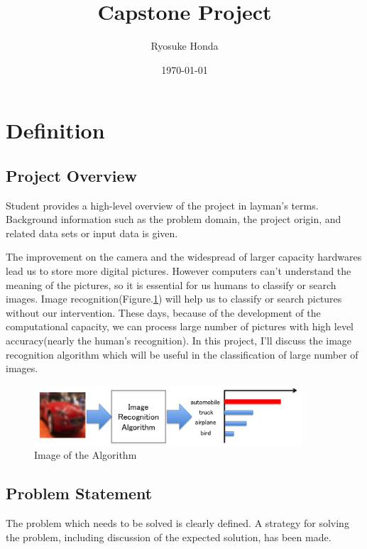 \documentclass[a4paper,10pt,fleqn]{article}
\title{{\Huge Capstone Project}}%
\author{Ryosuke Honda}
\date{\today}
\begin{document}
\maketitle

\section{Definition}
\subsection{Project Overview}
Student provides a high-level overview of the project in layman’s terms. Background information such as the problem domain, the project origin, and related data sets or input data is given.


The improvement on the camera and the widespread of larger capacity hardwares lead us to store more digital pictures. However computers can't understand the meaning of the pictures, so it is essential for us humans to classify or search images. Image recognition(Figure.\ref{fig:one}) will help us to classify or search pictures without our intervention. These days, because of the development of the computational capacity, we can process large number of pictures with high level accuracy(nearly the human's recognition). In this project, I'll discuss the image recognition algorithm which will be useful in the classification of large number of images.


\begin{figure}[htbp]

\begin{center}
\includegraphics[width=10cm]{picture/Image_Recognition.png}
\end{center}
\caption{Image of the Algorithm}
\label{fig:one}

\end{figure}



\subsection{Problem Statement}
The problem which needs to be solved is clearly defined. A strategy for solving the problem, including discussion of the expected solution, has been made.
\end{document}
